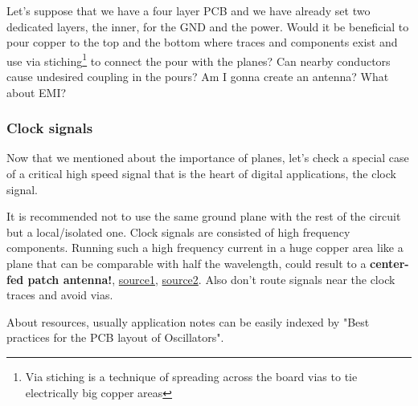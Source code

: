 \documentclass[final]{cubedoc}
\begin{document}
	Let's suppose that we have a four layer PCB and we have already set two dedicated layers, the inner, for the GND and the power. Would it be beneficial to pour copper to the top and the bottom where traces and components exist and use via stiching\footnote{Via stiching is a technique of spreading across the board vias to tie electrically big copper areas} to connect the pour with the planes? Can nearby conductors cause undesired coupling in the pours? Am I gonna create an antenna? What about EMI?
	
	\subsubsection{Clock signals}
	
	Now that we mentioned about the importance of planes, let's check a special case of a critical high speed signal that is the heart of digital applications, the clock signal.
	
	It is recommended not to use the same ground plane with the rest of the circuit but a local/isolated one. Clock signals are consisted of high frequency components. Running such a high frequency current in a huge copper area like a plane that can be comparable with half the wavelength, could result to a \textbf{center-fed patch antenna!}, \href{https://electronics.stackexchange.com/questions/15135/decoupling-caps-pcb-layout/15143#15143}{source1}, \href{https://electronics.stackexchange.com/questions/39136/competing-pcb-crystal-layout-recommendations}{source2}. Also don't route signals near the clock traces and avoid vias.
	
	About resources, usually application notes can be easily indexed by "Best practices for the PCB layout of Oscillators".
	
	
	
	
\end{document}
